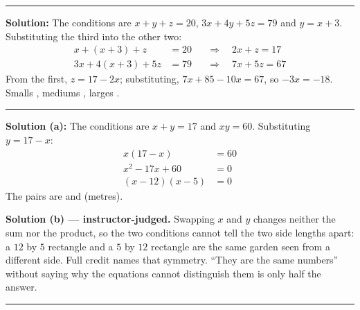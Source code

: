 \documentclass[12pt]{article}
\begin{document}
\vspace{0.2cm}\noindent\rule{\linewidth}{0.2pt}


\textbf{Solution:} The conditions are $x + y + z = 20$, $3x + 4y + 5z = 79$ and $y = x + 3$.
Substituting the third into the other two:
\begin{align*}
  x + (x + 3) + z &= 20 &&\Longrightarrow\quad 2x + z = 17 \\
  3x + 4(x + 3) + 5z &= 79 &&\Longrightarrow\quad 7x + 5z = 67
\end{align*}
From the first, $z = 17 - 2x$; substituting, $7x + 85 - 10x = 67$, so $-3x = -18$.
Smalls , mediums , larges .

\vspace{0.2cm}\noindent\rule{\linewidth}{0.2pt}


\textbf{Solution (a):} The conditions are $x + y = 17$ and $xy = 60$. Substituting
$y = 17 - x$:
\begin{align*}
  x(17 - x) &= 60 \\
  x^2 - 17x + 60 &= 0 \\
  (x - 12)(x - 5) &= 0
\end{align*}
The pairs are  and  (metres).

\vspace{0.15cm}
\textbf{Solution (b) --- instructor-judged.} Swapping $x$ and $y$ changes neither the sum
nor the product, so the two conditions cannot tell the two side lengths apart: a $12$ by $5$
rectangle and a $5$ by $12$ rectangle are the same garden seen from a different side. Full
credit names that symmetry. ``They are the same numbers'' without saying why the equations
cannot distinguish them is only half the answer.

\vspace{0.2cm}\noindent\rule{\linewidth}{0.2pt}

\end{document}
